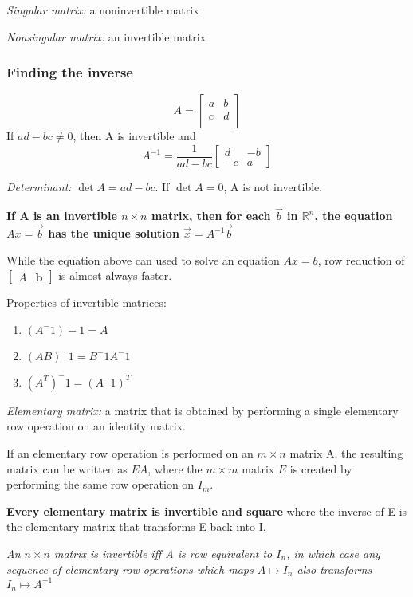 \documentclass[12pt]{article} %
\newcommand{\R}{\mathbb{R}}
\begin{document}
\emph{Singular matrix:} a noninvertible matrix 

\emph{Nonsingular matrix:} an invertible matrix

\subsubsection{Finding the inverse}
$$A = \begin{bmatrix}
	a & b\\
	c & d\\
\end{bmatrix}$$
If $ad - bc \neq 0$, then A is invertible and 
$$A^{-1} = \frac{1}{ad - bc}\begin{bmatrix}
	d & -b\\
	-c & a
\end{bmatrix}$$

\emph{Determinant:} $\det A = ad - bc$. If $\det A = 0$, A is not invertible. 

\textbf{If A is an invertible $n \times n$ matrix, then for each $\vec{b}$ in $\R^n$, the equation $Ax = \vec{b}$ has the unique solution $\vec{x} = A^{-1}\vec{b}$}

While the equation above can used to solve an equation $Ax = b$, row reduction of $\begin{bmatrix}
	A & \mathbf{b}
\end{bmatrix}$ is almost always faster.

Properties of invertible matrices:
\begin{enumerate}
	\item $(A^-1)-1 = A$
	\item $(AB)^-1 = B^-1A^-1$
	\item $(A^T)^-1 = (A^-1)^T$
\end{enumerate}

\emph{Elementary matrix:} a matrix that is obtained by performing a single elementary row operation on an identity matrix.

If an elementary row operation is performed on an $m \times n$ matrix A, the resulting matrix can be written as $EA$, where the $m \times m$ matrix $E$ is created by performing the same row operation on $I_m$.

\textbf{Every elementary matrix is invertible and square} where the inverse of E is the elementary matrix that transforms E back into I.

\emph{An $n \times n$ matrix is invertible iff A is row equivalent to $I_n$, in which case any sequence of elementary row operations which maps $A \mapsto I_n$ also transforms $I_n \mapsto A^{-1}$}
\end{document}
